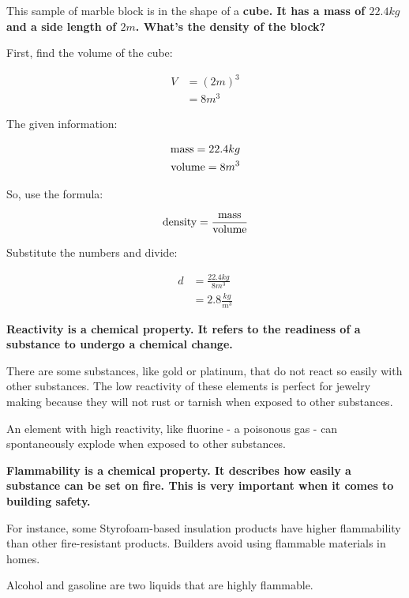 \begin{example}
    This sample of marble block is in the shape of a \bf{cube}. It has a mass
    of $22.4 kg$ and a side length of $2 m$. What's the density of the block?

    First, find the volume of the cube:

    \begin{align}
     V &= (2 m)^3 \\
       &= 8 m^3
    \end{align}

    The given information:

    \begin{align}
        \rm{mass} = 22.4 kg \\
        \rm{volume} = 8 m^3
    \end{align}

    So, use the formula:

    \begin{align}
        \rm{density} = \frac{\rm{mass}}{\rm{volume}}
    \end{align}

    Substitute the numbers and divide:

    \begin{align}
        d &= \frac{22.4 kg}{8 m^3} \\
          &= 2.8 \frac{kg}{m^3}
    \end{align}
\end{example}

\begin{definition}[Reactivity]
    \bf{Reactivity} is a chemical property. It refers to the readiness of a substance to undergo a chemical change.
    
    There are some substances, like gold or platinum, that do not react so easily
    with other substances. The low reactivity of these elements is perfect for
    jewelry making because they will not rust or tarnish when exposed to other
    substances.
    
    An element with high reactivity, like fluorine - a poisonous gas - can spontaneously explode when exposed to other substances.
\end{definition}

\begin{definition}[Flammability]
    \bf{Flammability} is a chemical property. It describes how easily a
    substance can be set on fire. This is very important when it comes to
    building safety.
    
    For instance, some Styrofoam-based insulation products have higher
    flammability than other fire-resistant products. Builders avoid using
    flammable materials in homes.
    
    Alcohol and gasoline are two liquids that are highly flammable.
\end{definition}

